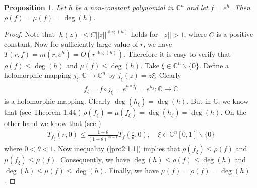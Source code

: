 \documentclass[11pt,reqno]{amsart}
\newtheorem{propo}{Proposition}[section]
\numberwithin{equation}{section}
\begin{document}
\begin{propo}\label{Pro2} Let $h$ be a non-constant polynomial in $\mathbb{C}^n$ and let $f=e^{h}$. Then $\rho(f)=\mu(f)=\deg(h)$.
\end{propo}
\begin{proof} Note that $|h(z)|\leq C||z||^{\deg(h)}$ holds for $||z||>1$, where $C$ is a positive constant. Now for sufficiently large value of $r$, we have $T(r,f)=m\left(r,e^h\right)=O\left(r^{\deg(h)}\right)$. Therefore it is easy to verify that $\rho(f)\leq \deg(h)$ and $\mu(f)\leq \deg(h)$. Take $\xi\in\mathbb{C}^n\backslash \{0\}$. Define a holomorphic mapping $j_{\xi}:\mathbb{C}\to \mathbb{C}^n$ by $j_{\xi}(z)=z\xi$. Clearly
\begin{align*}
f_{\xi}=f\circ j_{\xi}=e^{h\circ j_{\xi}}=e^{h_{\xi}}:\mathbb{C}\to \mathbb{C}
\end{align*}
is a holomorphic mapping. Clearly $\deg(h_{\xi})=\deg(h)$. But in $\mathbb{C}$, we know that (see Theorem 1.44 \cite{Yang-Yi-2003}) $\rho(f_{\xi})=\mu(f_{\xi})=\deg(h_{\xi})=\deg(h)$. On the other hand we know that (see \cite[pp.286]{Hu-Li-Yang-2003})
\begin{align}\label{pro2:1.1} 
T_{f_{\xi}}(r,0)\leq \frac{1+\theta}{(1-\theta)^{2n-1}} T_{f}\left(\frac{r}{\theta},0\right),\quad \xi\in\mathbb{C}^n[0,1]\backslash \{0\}
\end{align}
where $0<\theta<1$. Now inequality (\ref{pro2:1.1}) implies that
$\rho(f_{\xi})\leq \rho(f)$ and $\mu(f_{\xi})\leq \mu(f)$. Consequently, we have $\deg(h)\leq \rho(f)\leq \deg(h)$ and $\deg(h)\leq \mu(f)\leq \deg(h)$. Finally, we have $\mu(f)=\rho(f)=\deg(h)$.
\end{proof}
\end{document}
